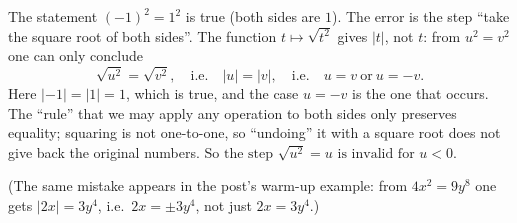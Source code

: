 The statement $(-1)^2=1^2$ is true (both sides are $1$). The error is the step ``take the square root of both sides''. The function $t\mapsto\sqrt{t^{2}}$ gives $|t|$, not $t$: from $u^2=v^2$ one can only conclude
\[
\sqrt{u^2}=\sqrt{v^2},\quad\text{i.e.}\quad |u|=|v|,\quad\text{i.e.}\quad u=v\ \text{or}\ u=-v .
\]
Here $|-1|=|1|=1$, which is true, and the case $u=-v$ is the one that occurs. The ``rule'' that we may apply any operation to both sides only preserves equality; squaring is not one-to-one, so ``undoing'' it with a square root does not give back the original numbers. So $\boxed{\text{the step }\sqrt{u^2}=u\text{ is invalid for }u<0}$.

(The same mistake appears in the post's warm-up example: from $4x^2=9y^8$ one gets $|2x|=3y^4$, i.e.\ $2x=\pm3y^4$, not just $2x=3y^4$.)
